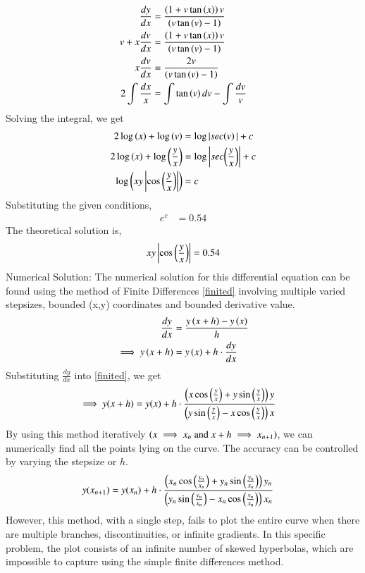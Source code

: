 \documentclass[journal]{IEEEtran}
\begin{document}
	\begin{align}
		\frac{dy}{dx} &= \frac{ \left(1 + v \tan\left(x\right) \right)v}{\left(v \tan\left(v\right) - 1 \right)}\\
		v + x\frac{dv}{dx} &= \frac{ \left(1 + v \tan\left(x\right) \right)v}{\left(v \tan\left(v\right) - 1 \right)}\\
		x\frac{dv}{dx} &= \frac{ 2v}{\left(v \tan\left(v\right) - 1 \right)}\\
		2\int\frac{dx}{x} &=  \int\tan\left(v\right)dv - \int\frac{dv}{v}
	\end{align}
	Solving the integral, we get
	\begin{align}
		2\log\left(x\right) + \log{\ensuremath{\left(v\right)}} &= \log|sec{\left(v\right)|} + c \\
		2\log\left(x\right) + \log{\ensuremath{\left(\frac{y}{x}\right)}} &= \log\left\vert sec{\left(\frac{y}{x}\right)}\right\vert + c \\
		\log{\ensuremath{\left(xy\left\vert\cos\left(\frac{y}{x}\right)\right\vert\right)}} &= c\\
	\end{align}
	Substituting the given conditions,
	\begin{align}
		e^c &= 0.54
	\end{align}
	The theoretical solution is,
	\begin{align}
		xy\left\vert\cos\left(\frac{y}{x}\right)\right\vert &= 0.54\\
	\end{align}
	\newline
	Numerical Solution:\newline
	The numerical solution for this differential equation can be found using the method of Finite Differences \eqref{finited} involving multiple varied stepsizes, bounded (x,y) coordinates and bounded derivative value.
	\begin{align}
		\frac{dy}{dx} &= \frac{y\left(x+h\right) - y\left(x\right)}{h} \\
		\implies y\left(x+h\right) &= y\left(x\right) + h\cdot\frac{dy}{dx} \label{finited}
	\end{align}
	Substituting $\frac{dy}{dx}$ into \eqref{finited}, we get
	\begin{align}
		\implies y(x+h) &= y(x) + h\cdot\frac{ \left(x \cos\left(\frac{y}{x}\right) + y \sin\left(\frac{y}{x}\right) \right)y}{\left(y \sin\left(\frac{y}{x}\right) - x \cos\left(\frac{y}{x}\right) \right)x} 
	\end{align}
	By using this method iteratively $\left(x \implies x_n \text{ and } x+h \implies x_{n+1}\right)$, we can numerically find all the points lying on the curve. The accuracy can be controlled by varying the stepsize or $h$.
	\begin{align}
		y(x_{n+1}) &= y(x_n) + h\cdot\frac{ \left(x_n \cos\left(\frac{y_n}{x_n}\right) + y_n \sin\left(\frac{y_n}{x_n}\right) \right)y_n}{\left(y_n \sin\left(\frac{y_n}{x_n}\right) - x_n \cos\left(\frac{y_n}{x_n}\right) \right)x_n} 
	\end{align}
	However, this method, with a single step, fails to plot the entire curve when there are multiple branches, discontinuities, or infinite gradients. In this specific problem, the plot consists of an infinite number of skewed hyperbolas, which are impossible to capture using the simple finite differences method.  
	
\end{document}
